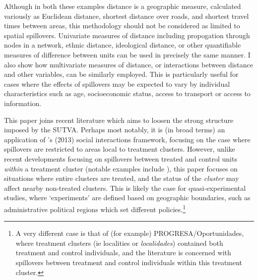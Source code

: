Although in both these examples distance is a geographic measure, calculated
variously as Euclidean distance, shortest distance over roads, and shortest 
travel times between areas, this methodology should not be considered as limited 
to spatial spillovers.  Univariate measures of distance including propogation 
through nodes in a network, ethnic distance, ideological distance, or other 
quantifiable measures of difference between units can be used in precisely the 
same manner.  I also show how multivariate measures of distance, or interactions 
between distance and other variables, can be similarly employed.  This is 
particularly useful for cases where the effects of spillovers may be expected to 
vary by individual characteristics such as age, socioeconomic status, access to 
transport or access to information.

This paper joins recent literature which aims to loosen the strong structure 
imposed by the SUTVA.  Perhaps most notably, it is (in broad terms) an 
application of \citeauthor{Manski2013}'s (2013) social interactions framework, 
focusing on the case where spillovers are restricted to areas local to treatment 
clusters.  However, unlike recent developments focusing on spillovers 
between treated and control units \emph{within} a treatment cluster (notable
examples include \citet{McIntosh2008,Bairdetal2014,AngelucciDiMaro2010}), this 
paper focuses on situations where entire clusters are treated, and the status
of the \emph{cluster} may affect nearby non-treated clusters.  This is likely
the case for quasi-experimental studies, where `experiments' are defined based
on geographic boundaries, such as administrative political regions which set 
different policies.\footnote{A very different case is that of (for example)
PROGRESA/Oportunidades, where treatment clusters (ie localities or 
\emph{localidades}) contained both treatment and control individuals, and the
literature is concerned with spillovers between treatment and control individuals
within this treatment cluster.}

